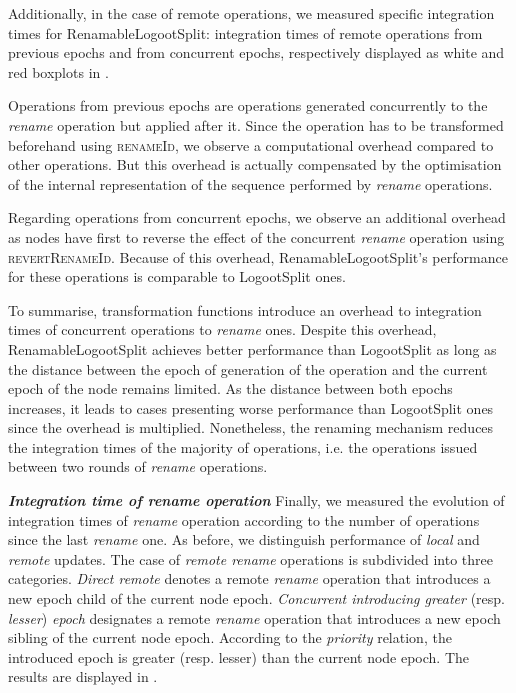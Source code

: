 \documentclass[10pt,journal,compsoc]{IEEEtran}
\newcommand{\ie}{i.e. }
\newcommand{\headerparagraph}[1]{\textbf{\emph{#1}}\quad}
\begin{document}
Additionally, in the case of remote operations, we measured specific integration times for RenamableLogootSplit: integration times of remote operations from previous epochs and from concurrent epochs, respectively displayed as white and red boxplots in .

Operations from previous epochs are operations generated concurrently to the \emph{rename} operation but applied after it.
Since the operation has to be transformed beforehand using \textsc{renameId}, we observe a computational overhead compared to other operations.
But this overhead is actually compensated by the optimisation of the internal representation of the sequence performed by \emph{rename} operations.

Regarding operations from concurrent epochs, we observe an additional overhead as nodes have first to reverse the effect of the concurrent \emph{rename} operation using \textsc{revertRenameId}.
Because of this overhead, RenamableLogootSplit's performance for these operations is comparable to LogootSplit ones.

To summarise, transformation functions introduce an overhead to integration times of concurrent operations to \emph{rename} ones.
Despite this overhead, RenamableLogootSplit achieves better performance than LogootSplit as long as the distance between the epoch of generation of the operation and the current epoch of the node remains limited.
As the distance between both epochs increases, it leads to cases presenting worse performance than LogootSplit ones since the overhead is multiplied.
Nonetheless, the renaming mechanism reduces the integration times of the majority of operations, \ie the operations issued between two rounds of \emph{rename} operations.

\headerparagraph{Integration time of \emph{rename} operation}
%
Finally, we measured the evolution of integration times of \emph{rename} operation according to the number of operations since the last \emph{rename} one.
As before, we distinguish performance of \emph{local} and \emph{remote} updates.
The case of \emph{remote rename} operations is subdivided into three categories.
\emph{Direct remote} denotes a remote \emph{rename} operation that introduces a new epoch child of the current node epoch.
\emph{Concurrent introducing greater} (resp. \emph{lesser}) \emph{epoch} designates a remote \emph{rename} operation that introduces a new epoch sibling of the current node epoch.
According to the \emph{priority} relation, the introduced epoch is greater (resp. lesser) than the current node epoch.
The results are displayed in .
\end{document}

